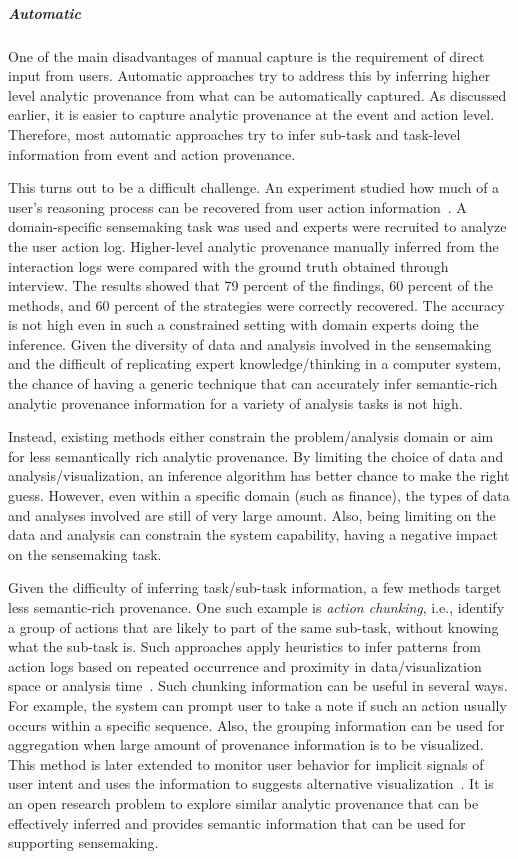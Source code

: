 \subparagraph{Automatic}
One of the main disadvantages of manual capture is the requirement of direct input from users. Automatic approaches try to address this by inferring higher level analytic provenance from what can be automatically captured. As discussed earlier, it is easier to capture analytic provenance at the event and action level. Therefore, most automatic approaches try to infer sub-task and task-level information from event and action provenance.

This turns out to be a difficult challenge. An experiment studied how much of a user's reasoning process can be recovered from user action information~\cite{Dou2009}. A domain-specific sensemaking task was used and experts were recruited to analyze the user action log. Higher-level analytic provenance manually inferred from the interaction logs were compared with the ground truth obtained through interview. The results showed that 79 percent of the findings, 60 percent of the methods, and 60 percent of the strategies were correctly recovered. The accuracy is not high even in such a constrained setting with domain experts doing the inference. Given the diversity of data and analysis involved in the sensemaking and the difficult of replicating expert knowledge/thinking in a computer system, the chance of having a generic technique that can accurately infer semantic-rich analytic provenance information for a variety of analysis tasks is not high.

Instead, existing methods either constrain the problem/analysis domain or aim for less semantically rich analytic provenance. By limiting the choice of data and analysis/visualization, an inference algorithm has better chance to make the right guess. However, even within a specific domain (such as finance), the types of data and analyses involved are still of very large amount. Also, being limiting on the data and analysis can constrain the system capability, having a negative impact on the sensemaking task.

Given the difficulty of inferring task/sub-task information, a few methods target less semantic-rich provenance. One such example is \emph{action chunking}, i.e., identify a group of actions that are likely to part of the same sub-task, without knowing what the sub-task is. Such approaches apply heuristics to infer patterns from action logs based on repeated occurrence and proximity in data/visualization space or analysis time~\cite{Gotz2009}. Such chunking information can be useful in several ways. For example, the system can prompt user to take a note if such an action usually occurs within a specific sequence. Also, the grouping information can be used for aggregation when large amount of provenance information is to be visualized. This method is later extended to monitor user behavior for implicit signals of user intent and uses the information to suggests alternative visualization~\cite{Gotz2009}. It is an open research problem to explore similar analytic provenance that can be effectively inferred and provides semantic information that can be used for supporting sensemaking.

